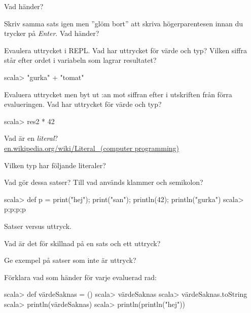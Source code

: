 \Subtask Vad händer? 

\Subtask Skriv samma sats igen men ''glöm bort'' att skriva högerparentesen innan du trycker på \textit{Enter}. Vad händer?

\Subtask Evaulera uttrycket  i REPL. Vad har uttrycket för värde och typ? Vilken siffra står efter ordet  i variabeln som lagrar resultatet?

\begin{REPL}
scala> "gurka" + "tomat"   
\end{REPL}

\Subtask Evaluera uttrycket  men byt ut :an mot siffran efter  i utskriften från förra evalueringen. Vad har uttrycket för värde och typ?
\begin{REPL}
scala> res2 * 42
\end{REPL}


\Task\Pen Vad är en \textit{literal}? \\ \href{https://en.wikipedia.org/wiki/Literal\_\%28computer_programming\%29}{en.wikipedia.org/wiki/Literal\_(computer programming)}

\Task Vilken typ har följande literaler?

\Subtask {} 

\Subtask {}

\Subtask {}

\Subtask {}

\Subtask {}

\Subtask {}

\Subtask {}

\Subtask {}

\Subtask {}

\Subtask {}

\Subtask {}


\Task\Pen Vad gör dessa satser? Till vad används klammer och semikolon?
\begin{REPL}
scala> def p = { print("hej"); print("san"); println(42); println("gurka") }
scala> p;p;p;p
\end{REPL}

\Task\Pen Satser versus uttryck. 

\Subtask Vad är det för skillnad på en sats och ett uttryck?

\Subtask Ge exempel på satser som inte är uttryck?

\Subtask Förklara vad som händer för varje evaluerad rad:
\begin{REPL}[numbers=left, numberstyle=\color{black}\ttfamily\scriptsize\selectfont]
scala> def värdeSaknas = ()
scala> värdeSaknas
scala> värdeSaknas.toString
scala> println(värdeSaknas)
scala> println(println("hej"))
\end{REPL}

